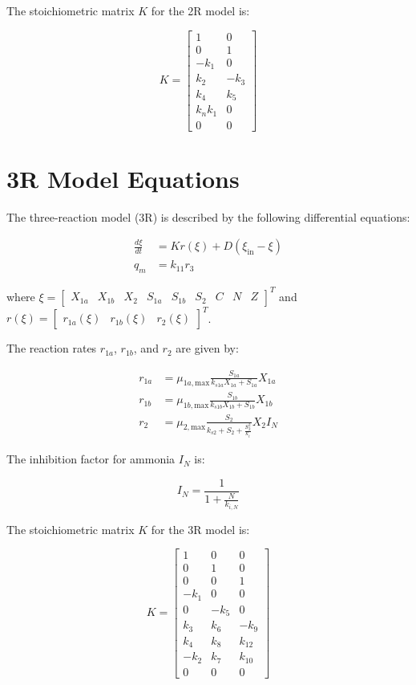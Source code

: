 \documentclass{article}
\begin{document}
The stoichiometric matrix \( K \) for the 2R model is:

\begin{equation*}
K = \begin{bmatrix}
1 & 0 \\
0 & 1 \\
-k_1 & 0 \\
k_2 & -k_3 \\
k_4 & k_5 \\
k_n k_1 & 0 \\
0 & 0
\end{bmatrix}
\end{equation*}

\section*{3R Model Equations}

The three-reaction model (3R) is described by the following differential equations:

\begin{align*}
\frac{d\xi}{dt} &= K r(\xi) + D(\xi_{\text{in}} - \xi) \\
q_m &= k_{11} r_3
\end{align*}

where \( \xi = \begin{bmatrix} X_{1a} & X_{1b} & X_2 & S_{1a} & S_{1b} & S_2 & C & N & Z \end{bmatrix}^T \) and \( r(\xi) = \begin{bmatrix} r_{1a}(\xi) & r_{1b}(\xi) & r_2(\xi) \end{bmatrix}^T \).

The reaction rates \( r_{1a} \), \( r_{1b} \), and \( r_2 \) are given by:

\begin{align*}
r_{1a} &= \mu_{1a,\text{max}} \frac{S_{1a}}{k_{s1a} X_{1a} + S_{1a}} X_{1a} \\
r_{1b} &= \mu_{1b,\text{max}} \frac{S_{1b}}{k_{s1b} X_{1b} + S_{1b}} X_{1b} \\
r_2 &= \mu_{2,\text{max}} \frac{S_2}{k_{s2} + S_2 + \frac{S_2^2}{k_i}} X_2 I_N
\end{align*}

The inhibition factor for ammonia \( I_N \) is:

\begin{equation*}
I_N = \frac{1}{1 + \frac{N}{k_{i,N}}}
\end{equation*}

The stoichiometric matrix \( K \) for the 3R model is:

\begin{equation*}
K = \begin{bmatrix}
1 & 0 & 0 \\
0 & 1 & 0 \\
0 & 0 & 1 \\
-k_1 & 0 & 0 \\
0 & -k_5 & 0 \\
k_3 & k_6 & -k_9 \\
k_4 & k_8 & k_{12} \\
-k_2 & k_7 & k_{10} \\
0 & 0 & 0
\end{bmatrix}
\end{equation*}
\end{document}
